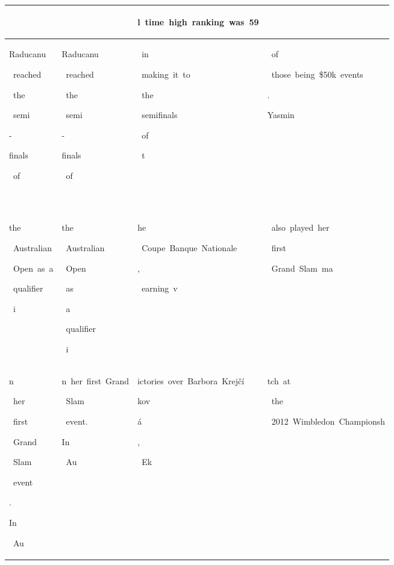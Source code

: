 \begin{table}[h]
\begin{tabular}{ l | l | l | l }
  &  & \colorbox{cm_0!40}{\strut l\ time\ high\ ranking\ was\ 59} &  \\ 
  \hline \colorbox{cm_32!40}{\strut Raducanu}\colorbox{cm_31!40}{\strut \ reached}\colorbox{cm_29!40}{\strut \ the}\colorbox{cm_33!40}{\strut \ semi}\colorbox{cm_31!40}{\strut -}\colorbox{cm_32!40}{\strut finals}\colorbox{cm_31!40}{\strut \ of}\colorbox{cm_34!40}{\strut \ } & \colorbox{cm_0!40}{\strut Raducanu}\colorbox{cm_12!40}{\strut \ reached}\colorbox{cm_25!40}{\strut \ the}\colorbox{cm_0!40}{\strut \ semi}\colorbox{cm_12!40}{\strut -}\colorbox{cm_0!40}{\strut finals}\colorbox{cm_12!40}{\strut \ of}\colorbox{cm_25!40}{\strut \ } & \colorbox{cm_12!40}{\strut \ in}\colorbox{cm_0!40}{\strut \ making\ it\ to}\colorbox{cm_12!40}{\strut \ the}\colorbox{cm_0!40}{\strut \ semifinals}\colorbox{cm_12!40}{\strut \ of}\colorbox{cm_25!40}{\strut \ t} & \colorbox{cm_12!40}{\strut \ of}\colorbox{cm_0!40}{\strut \ those\ being\ \$50k\ events}\colorbox{cm_12!40}{\strut .}\colorbox{cm_25!40}{\strut }\colorbox{cm_38!40}{\strut }\colorbox{cm_0!40}{\strut Yasmin} \\ 
 \colorbox{cm_34!40}{\strut the}\colorbox{cm_35!40}{\strut \ Australian}\colorbox{cm_32!40}{\strut \ Open\ as\ a}\colorbox{cm_37!40}{\strut \ qualifier}\colorbox{cm_38!40}{\strut \ i} & \colorbox{cm_25!40}{\strut the}\colorbox{cm_12!40}{\strut \ Australian}\colorbox{cm_25!40}{\strut \ Open}\colorbox{cm_12!40}{\strut \ as}\colorbox{cm_25!40}{\strut \ a}\colorbox{cm_38!40}{\strut \ qualifier}\colorbox{cm_12!40}{\strut \ i} & \colorbox{cm_25!40}{\strut he}\colorbox{cm_0!40}{\strut \ Coupe\ Banque\ Nationale}\colorbox{cm_12!40}{\strut ,}\colorbox{cm_0!40}{\strut \ earning\ v} & \colorbox{cm_0!40}{\strut \ also\ played\ her}\colorbox{cm_12!40}{\strut \ first}\colorbox{cm_0!40}{\strut \ Grand\ Slam\ ma} \\ 
 \colorbox{cm_38!40}{\strut n}\colorbox{cm_24!40}{\strut \ her}\colorbox{cm_31!40}{\strut \ first}\colorbox{cm_29!40}{\strut \ Grand}\colorbox{cm_32!40}{\strut \ Slam}\colorbox{cm_29!40}{\strut \ event}\colorbox{cm_30!40}{\strut .}\colorbox{cm_33!40}{\strut }\colorbox{cm_32!40}{\strut In}\colorbox{cm_35!40}{\strut \ Au} & \colorbox{cm_12!40}{\strut n\ her\ first\ Grand}\colorbox{cm_25!40}{\strut \ Slam}\colorbox{cm_12!40}{\strut \ event.}\colorbox{cm_25!40}{\strut }\colorbox{cm_38!40}{\strut }\colorbox{cm_51!40}{\strut In}\colorbox{cm_0!40}{\strut \ Au} & \colorbox{cm_0!40}{\strut ictories\ over\ Barbora\ Krejčí}\colorbox{cm_12!40}{\strut kov}\colorbox{cm_25!40}{\strut á}\colorbox{cm_12!40}{\strut ,}\colorbox{cm_0!40}{\strut \ Ek} & \colorbox{cm_0!40}{\strut tch\ at}\colorbox{cm_12!40}{\strut \ the}\colorbox{cm_0!40}{\strut \ 2012\ Wimbledon\ Championsh} \\ 

\end{tabular}
\end{table}
